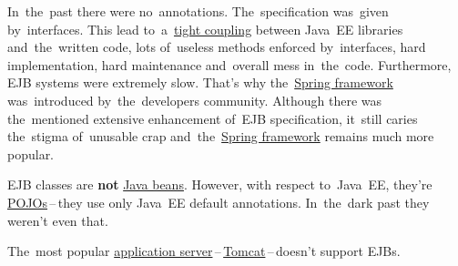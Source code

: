 In~the~past there were no~annotations.
The~specification was~given by~interfaces.
This lead to~a~\hyperref[loosetightcoupling]{tight coupling} between Java~EE libraries and~the~written code, lots of~useless methods enforced by~interfaces, hard implementation, hard maintenance and~overall mess in~the~code.
Furthermore, EJB systems were extremely slow.
That's why the~\hyperref[springframework]{Spring framework} was~introduced by~the~developers community.
Although there was the~mentioned extensive enhancement of~EJB specification, it~still caries the~stigma of~unusable crap and~the~\hyperref[springframework]{Spring framework} remains much more popular.

\warning EJB classes are \textbf{not} \hyperref[javabeans]{Java beans}.
However, with respect to~Java~EE, they're \hyperref[pojo]{POJOs}\,--\,they use only Java~EE default annotations.
In~the~dark past they weren't even that.

\warning The~most popular \hyperref[applicationserver]{application server}\,--\,\hyperref[tomcat]{Tomcat}\,--\,doesn't support EJBs.



\label{classpath}

\label{classloaders}

\label{javax}

\label{garbagecollector}
